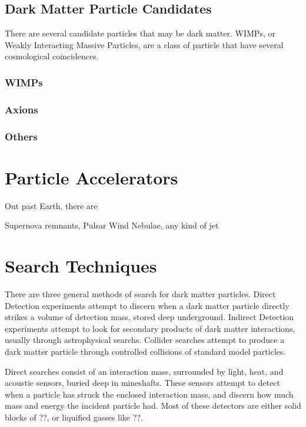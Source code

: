\subsection{Dark Matter Particle Candidates}

There are several candidate particles that may be dark matter.
WIMPs, or Weakly Interacting Massive Particles, are a class of particle that have several cosmological coincidences.


\subsubsection{WIMPs}

\subsubsection{Axions}

\subsubsection{Others}

\section{Particle Accelerators}

Out past Earth, there are 

Supernova remnants, Pulsar Wind Nebulae, any kind of jet


\section{Search Techniques}


There are three general methods of search for dark matter particles.
Direct Detection experiments attempt to discern when a dark matter particle directly strikes a volume of detection mass, stored deep underground.
Indirect Detection experiments attempt to look for secondary products of dark matter interactions, usually through astrophysical searchs.
Collider searches attempt to produce a dark matter particle through controlled collisions of standard model particles.

Direct searches consist of an interaction mass, surrounded by light, heat, and acoustic sensors, buried deep in mineshafts.
These sensors attempt to detect when a particle has struck the enclosed interaction mass, and discern how much mass and energy the incident particle had.
Most of these detectors are either solid blocks of ??, or liquified gasses like ??.

